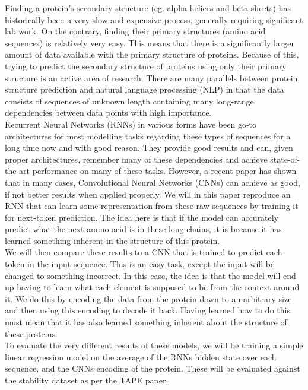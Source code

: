 %
Finding a protein's secondary structure (eg. alpha helices and beta sheets) has historically been a very slow and expensive process, generally requiring significant lab work. On the contrary, finding their primary structures (amino acid sequences) is relatively very easy. This means that there is a significantly larger amount of data available with the primary structure of proteins. Because of this, trying to predict the secondary structure of proteins using only their primary structure is an active area of research. There are many parallels between protein structure prediction and natural language processing (NLP) in that the data consists of sequences of unknown length containing many long-range dependencies between data points with high importance. \\

\noindent
Recurrent Neural Networks (RNNs) in various forms have been go-to architectures for most modelling tasks regarding these types of sequences for a long time now and with good reason. They provide good results and can, given proper architectures, remember many of these dependencies and achieve state-of-the-art performance on many of these tasks. However, a recent paper has shown that in many cases, Convolutional Neural Networks (CNNs) can achieve as good, if not better results when applied properly.\cite{intro} We will in this paper reproduce an RNN that can learn some representation from these raw sequences by training it for next-token prediction.\cite{unirep} The idea here is that if the model can accurately predict what the next amino acid is in these long chains, it is because it has learned something inherent in the structure of this protein.\\

\noindent
We will then compare these results to a CNN that is trained to predict each token in the input sequence. This is an easy task, except the input will be changed to something incorrect. In this case, the idea is that the model will end up having to learn what each element is supposed to be from the context around it. We do this by encoding the data from the protein down to an arbitrary size and then using this encoding to decode it back. Having learned how to do this must mean that it has also learned something inherent about the structure of these proteins. \\

\noindent
To evaluate the very different results of these models, we will be training a simple linear regression model on the average of the RNNs hidden state over each sequence, and the CNNs encoding of the protein. These will be evaluated against the stability dataset\cite{stability} as per the TAPE paper.\cite{tape}